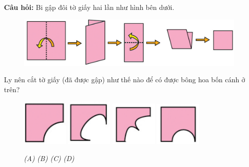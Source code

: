 \textbf{Câu hỏi:} Bi gập đôi tờ giấy hai lần như hình bên dưới.
\begin{figure}[H]
	\vspace*{-5pt}
	\captionsetup{labelformat=empty}
	\centering
	\captionsetup{justification=raggedleft}
	\includegraphics[width =1\textwidth]{cat-12}
	\vspace*{-10pt}
\end{figure}
Ly nên cắt tờ giấy (đã được gập) như thế nào để có được bông hoa bốn cánh ở trên?
\begin{figure}[H]
	\centering
	\captionsetup{labelformat=empty}
	\vspace*{-5pt}
	\captionsetup{justification=centering}
	\includegraphics[width =0.2\textwidth]{cat-13a}
	\hfill
	\includegraphics[width =0.2\textwidth]{cat-13b}
	\hfill
	\includegraphics[width =0.2\textwidth]{cat-13c}
	\hfill
	\includegraphics[width =0.2\textwidth]{cat-13d}	
	\vspace*{-5pt}
	\caption{\small \it (A)\hspace*{40pt} (B)\hspace*{65pt} (C) \hspace*{40pt} (D)}
	\vspace*{-10pt}
\end{figure}
